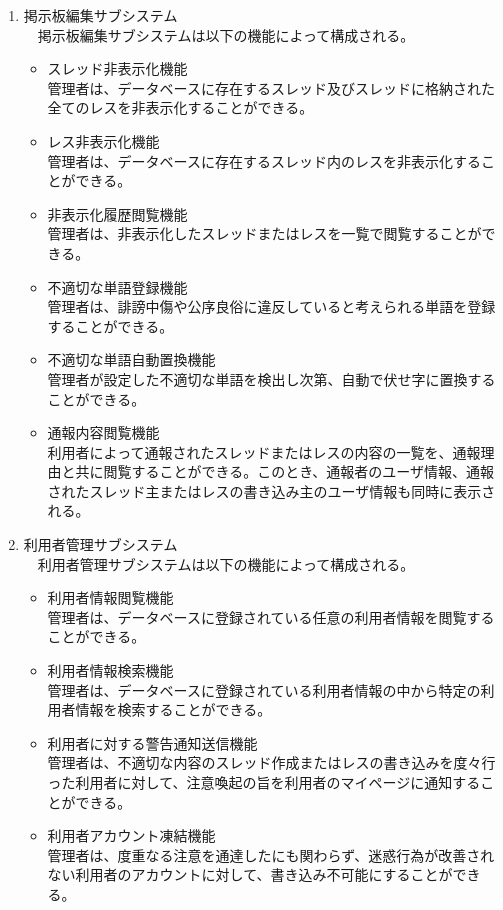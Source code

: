 \documentclass[a4j]{jarticle}
\begin{document}
\begin{enumerate}
  \item 掲示板編集サブシステム\\
  　掲示板編集サブシステムは以下の機能によって構成される。
  \begin{itemize}
    \item スレッド非表示化機能\\
    管理者は、データベースに存在するスレッド及びスレッドに格納された全てのレスを非表示化することができる。
    \item レス非表示化機能\\
    管理者は、データベースに存在するスレッド内のレスを非表示化することができる。
    \item 非表示化履歴閲覧機能\\
    管理者は、非表示化したスレッドまたはレスを一覧で閲覧することができる。
    \item 不適切な単語登録機能\\
    管理者は、誹謗中傷や公序良俗に違反していると考えられる単語を登録することができる。
    \item 不適切な単語自動置換機能\\
    管理者が設定した不適切な単語を検出し次第、自動で伏せ字に置換することができる。
    \item 通報内容閲覧機能\\
    利用者によって通報されたスレッドまたはレスの内容の一覧を、通報理由と共に閲覧することができる。このとき、通報者のユーザ情報、通報されたスレッド主またはレスの書き込み主のユーザ情報も同時に表示される。\\
  \end{itemize}


  \item 利用者管理サブシステム\\
  　利用者管理サブシステムは以下の機能によって構成される。
  \begin{itemize}
    \item 利用者情報閲覧機能\\
    管理者は、データベースに登録されている任意の利用者情報を閲覧することができる。
    \item 利用者情報検索機能\\
    管理者は、データベースに登録されている利用者情報の中から特定の利用者情報を検索することができる。
    \item 利用者に対する警告通知送信機能\\
    管理者は、不適切な内容のスレッド作成またはレスの書き込みを度々行った利用者に対して、注意喚起の旨を利用者のマイページに通知することができる。
    \item 利用者アカウント凍結機能\\
    管理者は、度重なる注意を通達したにも関わらず、迷惑行為が改善されない利用者のアカウントに対して、書き込み不可能にすることができる。\\
  \end{itemize}



\end{enumerate}
\end{document}

